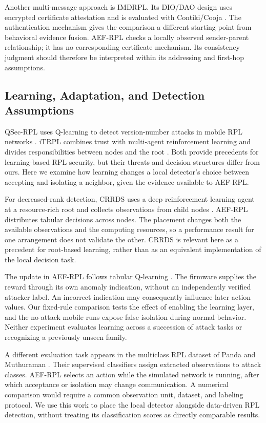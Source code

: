 Another multi-message approach is IMDRPL. Its DIO/DAO design uses encrypted certificate attestation and is evaluated with Contiki/Cooja \cite{imdrpl2023}. The authentication mechanism gives the comparison a different starting point from behavioral evidence fusion. AEF-RPL checks a locally observed sender-parent relationship; it has no corresponding certificate mechanism. Its consistency judgment should therefore be interpreted within its addressing and first-hop assumptions.

\subsection{Learning, Adaptation, and Detection Assumptions}
QSec-RPL uses Q-learning to detect version-number attacks in mobile RPL networks \cite{qsecrpl2023}. iTRPL combines trust with multi-agent reinforcement learning and divides responsibilities between nodes and the root \cite{itrpl2024}. Both provide precedents for learning-based RPL security, but their threats and decision structures differ from ours. Here we examine how learning changes a local detector's choice between accepting and isolating a neighbor, given the evidence available to AEF-RPL.

For decreased-rank detection, CRRDS uses a deep reinforcement learning agent at a resource-rich root and collects observations from child nodes \cite{haqdad2026}. AEF-RPL distributes tabular decisions across nodes. The placement changes both the available observations and the computing resources, so a performance result for one arrangement does not validate the other. CRRDS is relevant here as a precedent for root-based learning, rather than as an equivalent implementation of the local decision task.

The update in AEF-RPL follows tabular Q-learning \cite{watkins1992}. The firmware supplies the reward through its own anomaly indication, without an independently verified attacker label. An incorrect indication may consequently influence later action values. Our fixed-rule comparison tests the effect of enabling the learning layer, and the no-attack mobile runs expose false isolation during normal behavior. Neither experiment evaluates learning across a succession of attack tasks or recognizing a previously unseen family.

A different evaluation task appears in the multiclass RPL dataset of Panda and Muthuraman \cite{panda2026}. Their supervised classifiers assign extracted observations to attack classes. AEF-RPL selects an action while the simulated network is running, after which acceptance or isolation may change communication. A numerical comparison would require a common observation unit, dataset, and labeling protocol. We use this work to place the local detector alongside data-driven RPL detection, without treating its classification scores as directly comparable results.

